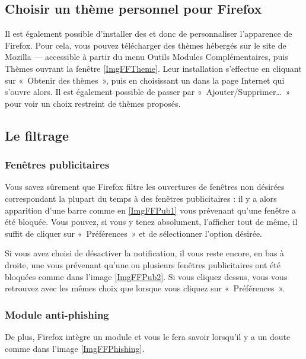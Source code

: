 \subsection{Choisir un thème personnel pour Firefox}
Il est également possible d'installer des  et donc de personnaliser l'apparence de Firefox. Pour cela, vous pouvez télécharger des thèmes hébergés sur le site de Mozilla --- accessible à partir du menu Outils \FlecheDroite Modules Complémentaires, puis Thèmes ouvrant la fenêtre \ref{ImgFFTheme}. Leur installation s'effectue en cliquant sur «~Obtenir des thèmes~», puis en choisissant un dans la page Internet qui s'ouvre alors. Il est également possible de passer par «~Ajouter/Supprimer\dots{}~» pour voir un choix restreint de thèmes proposés.
\subsection{Le filtrage}
\subsubsection{Fenêtres publicitaires}
Vous savez sûrement que Firefox filtre les ouvertures de fenêtres non désirées correspondant la plupart du temps à des fenêtres publicitaires : il y a alors apparition d'une barre comme en \ref{ImgFFPub1} vous prévenant qu'une fenêtre a été bloquée. Vous pouvez, si vous y tenez absolument, l'afficher tout de même, il suffit de cliquer sur «~Préférences~» et de sélectionner l'option désirée.\par
{}
Si vous avez choisi de désactiver la notification, il vous reste encore, en bas à droite, une  vous prévenant qu'une ou plusieurs fenêtres publicitaires ont été bloquées comme dans l'image \ref{ImgFFPub2}. Si vous cliquez dessus, vous vous retrouvez avec les mêmes choix que lorsque vous cliquez sur «~Préférences~».
\subsubsection{Module anti-phishing}
De plus, Firefox intègre un module  et vous le fera savoir lorsqu'il y a un doute comme dans l'image \ref{ImgFFPhishing}.
